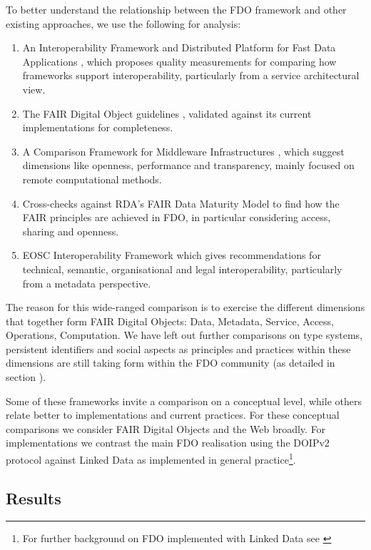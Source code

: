 To better understand the relationship between the FDO framework and other existing approaches, we use the following for analysis:

\begin{enumerate}
\tightlist
\item
  An Interoperability Framework and Distributed Platform for Fast Data Applications \cite{delgadoInteroperabilityFrameworkDistributed2016a}, which proposes quality measurements for comparing how frameworks support interoperability, particularly from a service architectural view.
\item
  The FAIR Digital Object guidelines \cite{bonino2019}, validated against its current implementations for completeness.
\item
  A Comparison Framework for Middleware Infrastructures \cite{zarrasComparisonFrameworkMiddleware2004a}, which suggest dimensions like openness, performance and transparency, mainly focused on remote computational methods.
\item
  Cross-checks against RDA's FAIR Data Maturity Model \cite{bahimFAIRDataMaturity2020a} to find how the FAIR principles are achieved in FDO, in particular considering access, sharing and openness.
\item
  EOSC Interoperability Framework \cite{eosc-interop-framework} which gives recommendations for technical, semantic, organisational and legal interoperability, particularly from a metadata perspective.
\end{enumerate}

The reason for this wide-ranged comparison is to exercise the different dimensions that together form FAIR Digital Objects: Data, Metadata, Service, Access, Operations, Computation.
We have left out further comparisons on type systems, persistent identifiers and social aspects as principles and practices within these dimensions are still taking form within the FDO community (as detailed in section ).

Some of these frameworks invite a comparison on a conceptual level, while others relate better to implementations and current practices. For these conceptual comparisons we consider FAIR Digital Objects and the Web broadly. For implementations we contrast the main FDO realisation using the DOIPv2 protocol \cite{DONA 2018} against Linked Data as implemented in general practice\footnote{For further background on FDO implemented with Linked Data see \cite{bonino2021,10.3897/rio.8.e94501}}.

\subsection{Results}\label{ch3:results}

